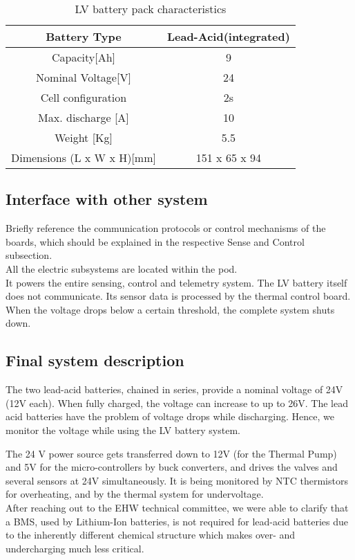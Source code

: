 \begin{table}
    \centering
    \begin{adjustbox}{width=\textwidth,center}
    \begin{tabular}{|c|c|}
       \hline
       Battery Type & Lead-Acid(integrated)\\
       \hline
       Capacity[Ah] & 9 \\
       \hline
       Nominal Voltage[V] & 24 \\
       \hline
       Cell configuration & 2s \\
       \hline
       Max. discharge [A] & 10 \\
       \hline
       Weight [Kg] & 5.5 \\
       \hline 
       Dimensions (L x W x H)[mm] & 151 x 65 x 94 \\
       \hline 
    \end{tabular}
    \end{adjustbox}
    \label{Low Voltage Battery Specs}
    \caption{LV battery pack characteristics}
\end{table}    

\subsection{Interface with other system}
Briefly reference the communication protocols or control mechanisms of the boards, which should be explained in the respective Sense and Control subsection. \\
All the electric subsystems are located within the pod. \\
It powers the entire sensing, control and telemetry system. 
The LV battery itself does not communicate. Its sensor data is processed by the thermal control board.
When the voltage drops below a certain threshold, the complete system shuts down.

\subsection{Final system description}
The two lead-acid batteries, chained in series, provide a nominal voltage of 24V (12V each). When fully charged, the voltage can increase to up to 26V. The lead acid batteries have the problem of voltage drops while discharging. Hence, we monitor the voltage while using the LV battery system.

The 24 V power source gets transferred down to 12V (for the Thermal Pump) and 5V for the micro-controllers by buck converters, and drives the valves and several sensors at 24V simultaneously. It is being monitored by NTC thermistors for overheating, and by the thermal system for undervoltage. \\
After reaching out to the EHW technical committee, we were able to clarify that a BMS, used by Lithium-Ion batteries, is not required for lead-acid batteries due to the inherently different chemical structure which makes over- and undercharging much less critical.

